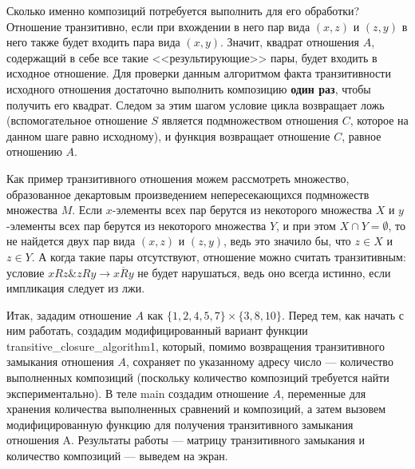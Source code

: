 \documentclass[12pt]{article}
\begin{document}
	Сколько именно композиций потребуется выполнить для его обработки? Отношение транзитивно, если при вхождении в него пар вида $(x, z)$ и $(z, y)$ в него также будет входить пара вида $(x, y)$. Значит, квадрат отношения $A$, содержащий в себе все такие <<результирующие>> пары, будет входить в исходное отношение. Для проверки данным алгоритмом факта транзитивности исходного отношения достаточно выполнить композицию {\bf один раз}, чтобы получить его квадрат. Следом за этим шагом условие цикла возвращает ложь (вспомогательное отношение $S$ является подмножеством отношения $C$, которое на данном шаге равно исходному), и функция возвращает отношение $C$, равное отношению $A$.
	
	Как пример транзитивного отношения можем рассмотреть множество, образованное декартовым произведением непересекающихся подмножеств множества $M$. Если $x$-элементы всех пар берутся из некоторого множества $X$ и $y$-элементы всех пар берутся из некоторого множества $Y$, и при этом $X \cap Y = \emptyset$, то не найдется двух пар вида $(x, z)$ и $(z, y)$, ведь это значило бы, что $z \in X$ и $z \in Y$. А когда такие пары отсутствуют, отношение можно считать транзитивным: условие $xRz \& zRy \to \overline{xRy}$ не будет нарушаться, ведь оно всегда истинно, если импликация следует из лжи.
	
	Итак, зададим отношение $A$ как $\{1, 2, 4, 5, 7\} \times \{3, 8, 10\}$. Перед тем, как начать с ним работать, создадим модифицированный вариант функции transitive\_closure\_algorithm1, который, помимо возвращения транзитивного замыкания отношения $A$, сохраняет по указанному адресу число --- количество выполненных композиций (поскольку количество композиций требуется найти экспериментально). В теле main создадим отношение $A$, переменные для хранения количества выполненных сравнений и композиций, а затем вызовем модифицированную функцию для получения транзитивного замыкания отношения A. Результаты работы --- матрицу транзитивного замыкания и количество композиций --- выведем на экран.
	
	 
	
	\begin{figure}[h]
		\noindent{}
	\end{figure}
	
\end{document}
